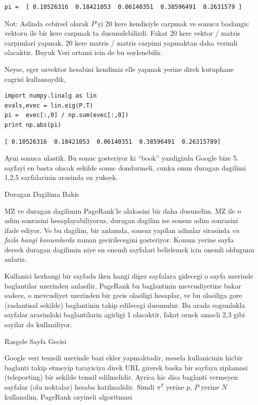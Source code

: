 \documentclass[12pt,fleqn]{article}\usepackage{../common}
\begin{document}
\begin{verbatim}
pi =  [ 0.10526316  0.18421053  0.06140351  0.38596491  0.2631579 ]
\end{verbatim}

Not: Aslinda cebirsel olarak $P$'yi 20 kere kendisiyle carpmak ve sonucu
baslangic vektoru ile bir kere carpmak ta dusunulebilirdi. Fakat 20 kere
vektor / matris carpimlari yapmak, 20 kere matris / matris carpimi
yapmaktan daha verimli olacaktir. Buyuk Veri ortami icin de bu soylenebilir.

Neyse, eger ozvektor hesabini kendimiz elle yapmak yerine direk kutuphane
cagrisi kullansaydik,

\begin{verbatim}
import numpy.linalg as lin
evals,evec = lin.eig(P.T)
pi =  evec[:,0] / np.sum(evec[:,0])
print np.abs(pi)
\end{verbatim}

\begin{verbatim}
[ 0.10526316  0.18421053  0.06140351  0.38596491  0.26315789]
\end{verbatim}

Ayni sonuca ulastik. Bu sonuc gosteriyor ki ``book'' yazdigizda Google bize
5. sayfayi en basta olacak sekilde sonuc dondurmeli, cunku onun duragan
dagilimi 1,2,5 sayfalarinin arasinda en yuksek.

Duragan Dagilima Bakis

MZ ve duragan dagilimin PageRank'le alakasini bir daha dusunelim. MZ ile
$n$ adim sonrasini hesaplayabiliyoruz, duragan dagilim ise sonsuz adim
sonrasini ifade ediyor. Ve bu dagilim, bir anlamda, sonsuz yapilan adimlar
sirasinda {\em en fazla hangi konumlarda} zaman gecirilecegini
gosteriyor. Konum yerine sayfa dersek duragan dagilimin niye en onemli
sayfalari belirlemek icin onemli oldugunu anlariz. 

Kullanici herhangi bir sayfada iken hangi diger sayfalara gidecegi o sayfa
uzerinde baglantilar uzerinden anlasilir, PageRank bu baglantinin
mevcudiyetine bakar sadece, o mevcudiyet uzerinden bir gecis olasiligi
hesaplar, ve bu olasiliga gore (raslantisal sekilde) baglantinin takip
edilecegi dusunulur. Bu arada cogunlukla sayfalar arasindaki baglantilarin
agirligi 1 olacaktir, fakat ornek amacli 2,3 gibi sayilar da kullaniliyor. 

Rasgele Sayfa Gecisi

Google veri temsili uzerinde bazi ekler yapmaktadir, mesela kullanicinin
hicbir baglanti takip etmeyip tarayiciya direk URL girerek baska bir
sayfaya ziplamasi (teleporting) bir sekilde temsil edilmelidir. Ayrica hic
disa baglanti vermeyen sayfalar (olu noktalar) hesaba katilmalidir. Simdi
$\pi^T$ yerine $p$, $P$ yerine $N$ kullanalim, PageRank ozyineli
algoritmasi
\end{document}
